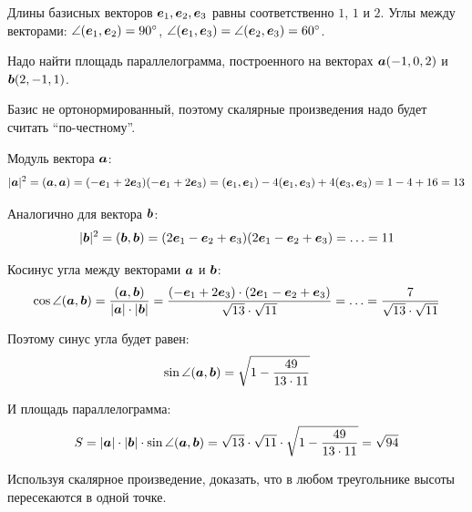 \documentclass[a4paper,12pt]{article}
\begin{document}
  
  \begin{problem}[2.22]
    Длины базисных векторов $\boldsymbol e_1, \boldsymbol e_2, \boldsymbol e_3$ равны соответственно $1$, $1$ и $2$.
    Углы между векторами: $\angle (\bds e_1, \bds e_2) \hm= 90\degree$, $\angle (\bds e_1, \bds e_3) \hm= \angle (\bds e_2, \bds e_3) \hm= 60\degree$.
    
    Надо найти площадь параллелограмма, построенного на векторах $\boldsymbol a (-1, 0, 2)$ и $\boldsymbol b (2, -1, 1)$.
  \end{problem}
  
  \begin{solution}
    Базис не ортонормированный, поэтому скалярные произведения надо будет считать ``по-честному''.
    
    Модуль вектора $\boldsymbol a$:
    \[
      |\boldsymbol a|^2 = (\boldsymbol a, \boldsymbol a) = (-\boldsymbol e_1 + 2\boldsymbol e_3)(-\boldsymbol e_1 + 2\boldsymbol e_3)
        = (\boldsymbol e_1, \boldsymbol e_1) - 4 (\boldsymbol e_1, \boldsymbol e_3) + 4 (\boldsymbol e_3, \boldsymbol e_3)
        = 1 - 4 + 16 = 13
    \]
    
    Аналогично для вектора $\boldsymbol b$:
    \[
      |\boldsymbol b|^2 = (\boldsymbol b, \boldsymbol b) = (2\boldsymbol e_1 - \boldsymbol e_2 + \boldsymbol e_3)(2\boldsymbol e_1 - \boldsymbol e_2 + \boldsymbol e_3)
        = \ldots = 11
    \]
    
    Косинус угла между векторами $\boldsymbol a$ и $\boldsymbol b$:
    \[
      \cos\angle(\boldsymbol a, \boldsymbol b) = \frac{(\boldsymbol a, \boldsymbol b)}{|\boldsymbol a| \cdot |\boldsymbol b|}
        = \frac{(-\boldsymbol e_1 + 2\boldsymbol e_3) \cdot (2\boldsymbol e_1 - \boldsymbol e_2 + \boldsymbol e_3)}{\sqrt{13} \cdot \sqrt{11}}
        = \ldots = \frac{7}{\sqrt{13} \cdot \sqrt{11}}
    \]
    
    Поэтому синус угла будет равен:
    \[
      \sin\angle(\boldsymbol a, \boldsymbol b) = \sqrt{1 - \frac{49}{13 \cdot 11}}
    \]
    
    И площадь параллелограмма:
    \[
      S = |\boldsymbol a| \cdot |\boldsymbol b| \cdot \sin\angle(\boldsymbol a, \boldsymbol b) = \sqrt{13} \cdot \sqrt{11} \cdot \sqrt{1 - \frac{49}{13 \cdot 11}} = \sqrt{94}
    \]
  \end{solution}
  
  
  \begin{problem}
    Используя скалярное произведение, доказать, что в любом треугольнике высоты пересекаются в одной точке.
  \end{problem}
  
\end{document}
